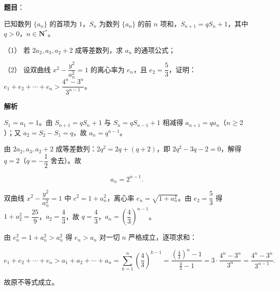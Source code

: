 \begin{answer}

\textbf{题目}：

已知数列 \(\{a_{n}\}\) 的首项为 \(1\)，\(S_{n}\) 为数列 \(\{a_{n}\}\) 的前 \(n\) 项和，\(S_{n+1}=qS_{n}+1\)，其中 \(q>0\)，\(n\in\mathbf{N}^{*}\)。

（1） 若 \(2a_{2},a_{3},a_{2}+2\) 成等差数列，求 \(a_{n}\) 的通项公式；

（2） 设双曲线 \(x^{2}-\dfrac{y^{2}}{a_{n}^{2}}=1\) 的离心率为 \(e_{n}\)，且 \(e_{2}=\dfrac{5}{3}\)，证明：\(e_{1}+e_{2}+\cdots+e_{n}>\dfrac{4^{n}-3^{n}}{3^{n-1}}\)。

\textbf{解析}


\(S_1=a_1=1\)。由 \(S_{n+1}=qS_n+1\) 与 \(S_n=qS_{n-1}+1\) 相减得 \(a_{n+1}=qa_n\)（\(n\geqslant2\)）；又 \(a_2=S_2-S_1=q\)，故 \(a_n=q^{n-1}\)。

由 \(2a_2,a_3,a_2+2\) 成等差数列：\(2q^{2}=2q+(q+2)\)，即 \(2q^{2}-3q-2=0\)，解得 \(q=2\)（\(q=-\dfrac{1}{2}\) 舍去）。故

\nopagebreak[4]
\[
a_n=2^{n-1}.
\]


双曲线 \(x^{2}-\dfrac{y^{2}}{a_n^{2}}=1\) 中 \(c^{2}=1+a_n^{2}\)，离心率 \(e_n=\sqrt{1+a_n^{2}}\)。由 \(e_2=\dfrac{5}{3}\) 得 \(1+a_2^{2}=\dfrac{25}{9}\)，\(a_2=\dfrac{4}{3}\)，故 \(q=\dfrac{4}{3}\)，\(a_n=\left(\dfrac{4}{3}\right)^{n-1}\)。

由 \(e_n^{2}=1+a_n^{2}>a_n^{2}\) 得 \(e_n>a_n\) 对一切 \(n\) 严格成立，逐项求和：

\nopagebreak[4]
\[
e_1+e_2+\cdots+e_n>a_1+a_2+\cdots+a_n=\sum_{k=1}^{n}\left(\frac{4}{3}\right)^{k-1}
=\frac{\left(\frac{4}{3}\right)^{n}-1}{\frac{4}{3}-1}
=3\cdot\frac{4^{n}-3^{n}}{3^{n}}=\frac{4^{n}-3^{n}}{3^{n-1}}.
\]

故原不等式成立。



\end{answer}
